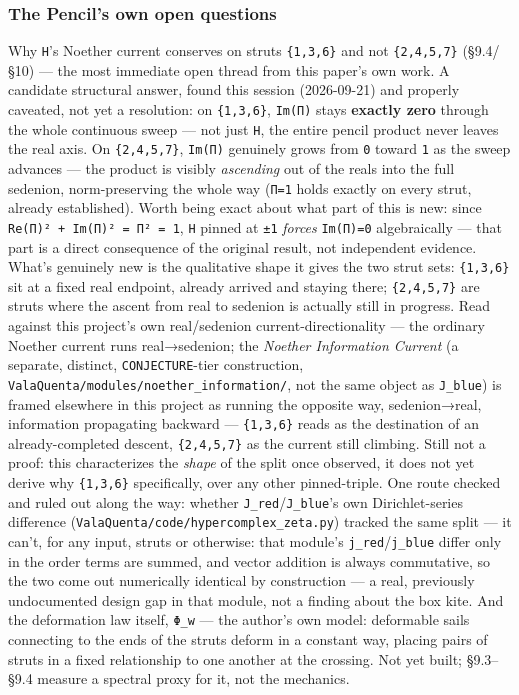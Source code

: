 \documentclass[
  10pt,
]{article}
\begin{document}
\hypertarget{the-pencils-own-open-questions}{%
\subsubsection{The Pencil's own open
questions}\label{the-pencils-own-open-questions}}

Why \texttt{H}'s Noether current conserves on struts \texttt{\{1,3,6\}}
and not \texttt{\{2,4,5,7\}} (§9.4/§10) --- the most immediate open
thread from this paper's own work. A candidate structural answer, found
this session (2026-09-21) and properly caveated, not yet a resolution:
on \texttt{\{1,3,6\}}, \texttt{Im(Π)} stays \textbf{exactly zero}
through the whole continuous sweep --- not just \texttt{H}, the entire
pencil product never leaves the real axis. On \texttt{\{2,4,5,7\}},
\texttt{\textbar{}Im(Π)\textbar{}} genuinely grows from \texttt{0}
toward \texttt{1} as the sweep advances --- the product is visibly
\emph{ascending} out of the reals into the full sedenion,
norm-preserving the whole way (\texttt{\textbar{}Π\textbar{}=1} holds
exactly on every strut, already established). Worth being exact about
what part of this is new: since
\texttt{Re(Π)²\ +\ \textbar{}Im(Π)\textbar{}²\ =\ \textbar{}Π\textbar{}²\ =\ 1},
\texttt{H} pinned at \texttt{±1} \emph{forces}
\texttt{\textbar{}Im(Π)\textbar{}=0} algebraically --- that part is a
direct consequence of the original result, not independent evidence.
What's genuinely new is the qualitative shape it gives the two strut
sets: \texttt{\{1,3,6\}} sit at a fixed real endpoint, already arrived
and staying there; \texttt{\{2,4,5,7\}} are struts where the ascent from
real to sedenion is actually still in progress. Read against this
project's own real/sedenion current-directionality --- the ordinary
Noether current runs real→sedenion; the \emph{Noether Information
Current} (a separate, distinct, \texttt{CONJECTURE}-tier construction,
\texttt{ValaQuenta/modules/noether\_information/}, not the same object
as \texttt{J\_blue}) is framed elsewhere in this project as running the
opposite way, sedenion→real, information propagating backward ---
\texttt{\{1,3,6\}} reads as the destination of an already-completed
descent, \texttt{\{2,4,5,7\}} as the current still climbing. Still not a
proof: this characterizes the \emph{shape} of the split once observed,
it does not yet derive why \texttt{\{1,3,6\}} specifically, over any
other pinned-triple. One route checked and ruled out along the way:
whether \texttt{J\_red}/\texttt{J\_blue}'s own Dirichlet-series
difference (\texttt{ValaQuenta/code/hypercomplex\_zeta.py}) tracked the
same split --- it can't, for any input, struts or otherwise: that
module's \texttt{j\_red}/\texttt{j\_blue} differ only in the order terms
are summed, and vector addition is always commutative, so the two come
out numerically identical by construction --- a real, previously
undocumented design gap in that module, not a finding about the box
kite. And the deformation law itself, \texttt{Φ\_w} --- the author's own
model: deformable sails connecting to the ends of the struts deform in a
constant way, placing pairs of struts in a fixed relationship to one
another at the crossing. Not yet built; §9.3--§9.4 measure a spectral
proxy for it, not the mechanics.
\end{document}
